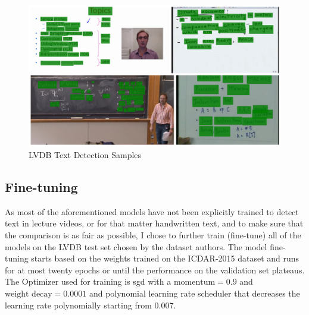 \begin{figure}[H]
        \centering
        \includegraphics[width=140mm]{figures/lvdb_textdet_collage.png}
        \caption{LVDB Text Detection Samples}
        \label{meth:lvdb_textdet_collage}
\end{figure}

\subsection{Fine-tuning}

As most of the aforementioned models have not been explicitly trained to detect text in lecture videos, or for that matter handwritten text, and to make sure that the comparison is as fair as possible, I chose to further train (fine-tune) all of the models on the LVDB test set chosen by the dataset authors. The model fine-tuning starts based on the weights trained on the ICDAR-2015 dataset and runs for at most twenty epochs or until the performance on the validation set plateaus. The Optimizer used for training is \gls{sgd} with a $\text{momentum} = 0.9$ and $\text{weight decay} = 0.0001$ and polynomial learning rate scheduler that decreases the learning rate polynomially starting from $0.007$.

